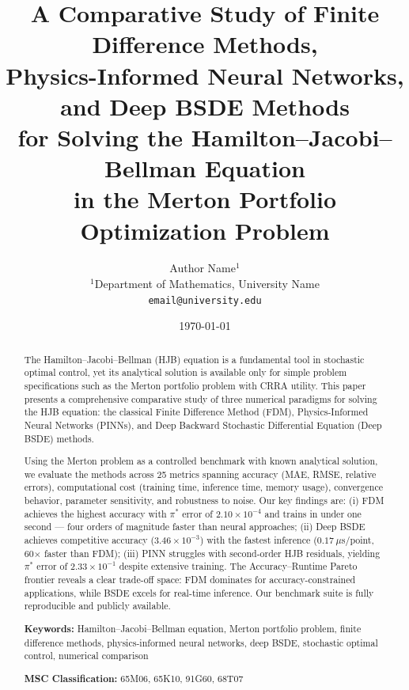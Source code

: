 \documentclass[12pt,a4paper]{article}
\title{\vspace{-2cm}\textbf{A Comparative Study of Finite Difference Methods,\\
Physics-Informed Neural Networks, and Deep BSDE Methods\\
for Solving the Hamilton--Jacobi--Bellman Equation\\
in the Merton Portfolio Optimization Problem}}
\author{Author Name$^{1}$ \\
\small $^{1}$Department of Mathematics, University Name \\
\small \texttt{email@university.edu}}
\date{\today}
\begin{document}
\maketitle
\thispagestyle{empty}

\begin{abstract}
\vspace{0.5cm}

The Hamilton--Jacobi--Bellman (HJB) equation is a fundamental tool in stochastic optimal control, yet its analytical solution is available only for simple problem specifications such as the Merton portfolio problem with CRRA utility. This paper presents a comprehensive comparative study of three numerical paradigms for solving the HJB equation: the classical Finite Difference Method (FDM), Physics-Informed Neural Networks (PINNs), and Deep Backward Stochastic Differential Equation (Deep BSDE) methods. 

Using the Merton problem as a controlled benchmark with known analytical solution, we evaluate the methods across 25 metrics spanning accuracy (MAE, RMSE, relative errors), computational cost (training time, inference time, memory usage), convergence behavior, parameter sensitivity, and robustness to noise. Our key findings are: (i) FDM achieves the highest accuracy with $\pi^*$ error of $2.10 \times 10^{-4}$ and trains in under one second --- four orders of magnitude faster than neural approaches; (ii) Deep BSDE achieves competitive accuracy ($3.46 \times 10^{-3}$) with the fastest inference ($0.17\ \mu$s/point, 60$\times$ faster than FDM); (iii) PINN struggles with second-order HJB residuals, yielding $\pi^*$ error of $2.33 \times 10^{-1}$ despite extensive training. The Accuracy--Runtime Pareto frontier reveals a clear trade-off space: FDM dominates for accuracy-constrained applications, while BSDE excels for real-time inference. Our benchmark suite is fully reproducible and publicly available.

\vspace{0.3cm}
\textbf{Keywords:} Hamilton--Jacobi--Bellman equation, Merton portfolio problem, finite difference methods, physics-informed neural networks, deep BSDE, stochastic optimal control, numerical comparison

\vspace{0.3cm}
\textbf{MSC Classification:} 65M06, 65K10, 91G60, 68T07
\end{abstract}
\end{document}
